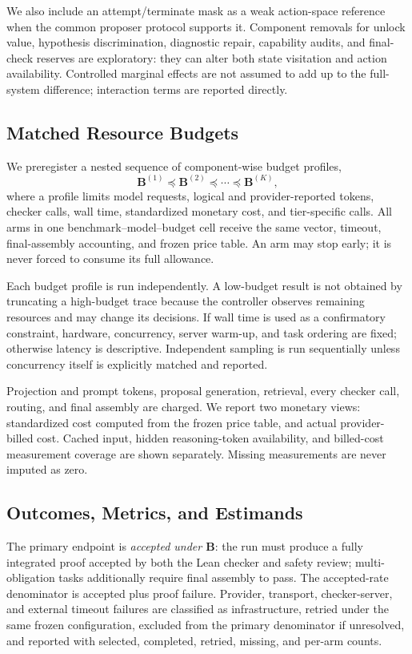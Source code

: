 We also include an attempt/terminate mask as a weak action-space reference when
the common proposer protocol supports it. Component removals for unlock value,
hypothesis discrimination, diagnostic repair, capability audits, and
final-check reserves are exploratory: they can alter both state visitation and
action availability. Controlled marginal effects are not assumed to add up to
the full-system difference; interaction terms are reported directly.

\subsection{Matched Resource Budgets}

We preregister a nested sequence of component-wise budget profiles,
\[
  \mathbf B^{(1)}\preceq\mathbf B^{(2)}\preceq\cdots
  \preceq\mathbf B^{(K)},
\]
where a profile limits model requests, logical and provider-reported tokens,
checker calls, wall time, standardized monetary cost, and tier-specific calls.
 All arms in one benchmark--model--budget cell receive the same vector,
timeout, final-assembly accounting, and frozen price table. An arm may stop
early; it is never forced to consume its full allowance.

Each budget profile is run independently. A low-budget result is not obtained
by truncating a high-budget trace because the controller observes remaining
resources and may change its decisions. If wall time is used as a confirmatory
constraint, hardware, concurrency, server warm-up, and task ordering are fixed;
otherwise latency is descriptive. Independent sampling is run sequentially
unless concurrency itself is explicitly matched and reported.

Projection and prompt tokens, proposal generation, retrieval, every checker
call, routing, and final assembly are charged. We report two monetary views:
standardized cost computed from the frozen price table, and actual
provider-billed cost. Cached input, hidden reasoning-token availability, and
billed-cost measurement coverage are shown separately. Missing measurements
are never imputed as zero.

\subsection{Outcomes, Metrics, and Estimands}

The primary endpoint is \emph{accepted under \(\mathbf B\)}: the run must
produce a fully integrated proof accepted by both the Lean checker and safety
review; multi-obligation tasks additionally require final assembly to pass.
The accepted-rate denominator is accepted plus proof failure. Provider,
transport, checker-server, and external timeout failures are classified as
infrastructure, retried under the same frozen configuration, excluded from the
primary denominator if unresolved, and reported with selected, completed,
retried, missing, and per-arm counts.

